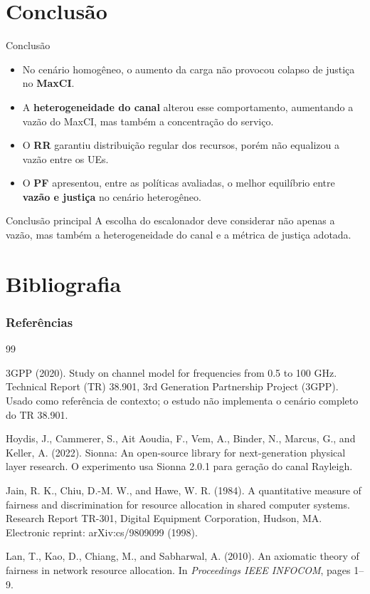 \documentclass[noamsthm,notheorems,11pt,compress,fontset=windows]{beamer}
\numberwithin{figure}{section}
\numberwithin{table}{section}
\numberwithin{equation}{section}
\theoremstyle{plain} %
\begin{document}
\section{Conclusão}
\begin{frame}{Conclusão}
     \begin{itemize}
         \item No cenário homogêneo, o aumento da carga não provocou colapso de justiça no \textbf{MaxCI}.
         \item A \textbf{heterogeneidade do canal} alterou esse comportamento, aumentando a vazão do MaxCI, mas também a concentração do serviço. \item O \textbf{RR} garantiu distribuição regular dos recursos, porém não equalizou a vazão entre os UEs.
         \item O \textbf{PF} apresentou, entre as políticas avaliadas, o melhor equilíbrio entre \textbf{vazão e justiça} no cenário heterogêneo.
    \end{itemize}
    \vspace{0.3cm}
    \begin{block}{Conclusão principal} A escolha do escalonador deve considerar não apenas a vazão, mas também a heterogeneidade do canal e a métrica de justiça adotada.
    \end{block}
\end{frame}

\section{Bibliografia}

\begin{frame}
\frametitle{Referências}
\small
\begin{thebibliography}{99}

3GPP (2020).
Study on channel model for frequencies from 0.5 to 100 GHz.
Technical Report (TR) 38.901,
3rd Generation Partnership Project (3GPP).
Usado como referência de contexto; o estudo não implementa o cenário completo do TR 38.901.

Hoydis, J., Cammerer, S., Ait Aoudia, F., Vem, A., Binder, N., Marcus, G., and Keller, A. (2022).
Sionna: An open-source library for next-generation physical layer research.
O experimento usa Sionna 2.0.1 para geração do canal Rayleigh.

Jain, R. K., Chiu, D.-M. W., and Hawe, W. R. (1984).
A quantitative measure of fairness and discrimination for resource allocation in shared computer systems.
Research Report TR-301, Digital Equipment Corporation, Hudson, MA.
Electronic reprint: arXiv:cs/9809099 (1998).

Lan, T., Kao, D., Chiang, M., and Sabharwal, A. (2010).
An axiomatic theory of fairness in network resource allocation.
In \emph{Proceedings IEEE INFOCOM}, pages 1–9.

\end{thebibliography}
\end{frame}
\end{document}
